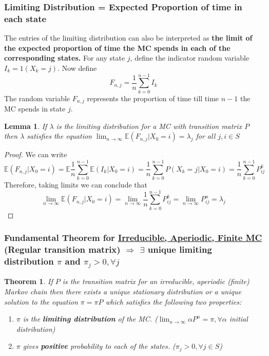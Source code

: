 \documentclass[11pt,a4paper]{article}
\newtheorem{theorem}{Theorem}
\newtheorem{lemma}{Lemma}
\begin{document}
\subsubsection{Limiting Distribution = Expected Proportion of time in each state}
The entries of the limiting distribution can also be interpreted as \textbf{the limit of the expected proportion of time the MC spends in each of the corresponding states.} For any state $j$, define the indicator random variable $I_k=1(X_k=j)$. Now define $$F_{n,j}=\frac{1}{n}\sum_{k=0}^{n-1}I_k$$
The random variable $F_{n,j}$ represents the proportion of time till time $n-1$ the MC spends in state $j$.

\begin{lemma}
    If $\lambda$ is the limiting distribution for a MC with transition matrix $P$ then $\lambda$ satisfies the equation $\lim_{n \rightarrow \infty}\mathbb{E}(F_{n,j}|X_0=i)=\lambda_j$ for all $j,i\in S$
\end{lemma}
\begin{proof}
    We can write $$\mathbb{E}(F_{n,j}|X_0=i)=\mathbb{E}\frac{1}{n}\sum_{k=0}^{n-1}\mathbb{E}(I_k|X_0=i)=\frac{1}{n}\sum_{k=0}^{n-1}P(X_k=j|X_0=i)=\frac{1}{n}\sum_{k=0}^{n-1}P_{ij}^k$$
    Therefore, taking limits we can conclude that $$\lim_{n \rightarrow \infty}\mathbb{E}(F_{n,j}|X_0=i)=\lim_{n \rightarrow \infty}\frac{1}{n}\sum_{k=0}^{n-1}P_{ij}^k=\lim_{n \rightarrow \infty}P_{ij}^n=\lambda_j$$
\end{proof}

\subsubsection{Fundamental Theorem for \underline{Irreducible, Aperiodic, Finite MC} (Regular transition matrix) $\Rightarrow $ $\exists$ unique limiting distribution $\pi$ and $\pi_j>0,\forall j$}
\begin{theorem}
    If $P$ is the transition matrix for an irreducible, aperiodic (finite) Markov chain then there exists a unique stationary distribution or a unique solution to the equation $\pi=\pi P$ which satisfies the following two properties:
    \begin{enumerate}[(1)]
        \item $\pi$ is the \textbf{limiting distribution} of the MC. ($\lim_{n \rightarrow \infty}\alpha P^n=\pi,\forall \alpha$ initial distribution)
        \item $\pi$ gives \textbf{positive} probability to each of the states. ($\pi_j>0,\forall j\in S$)
    \end{enumerate}
\end{theorem}
\end{document}
